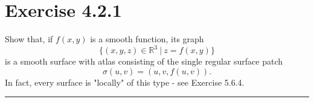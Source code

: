 \documentclass[12pt]{article}
\begin{document}
\maketitle

\section*{Exercise 4.2.1}
Show that, if $f(x, y)$ is a smooth function, its graph
$$
\lbrace(x,y,z) \in \mathbb{R}^3 \ | \ z = f(x,y) \rbrace
$$
is a smooth surface with atlas consisting of the single regular surface patch
$$
\sigma (u,v) = (u,v,f(u,v)).
$$
In fact, every surface is "locally" of this type - see Exercise 5.6.4.

\vspace{1cm}
\hrule
\vspace{1cm}
\end{document}
